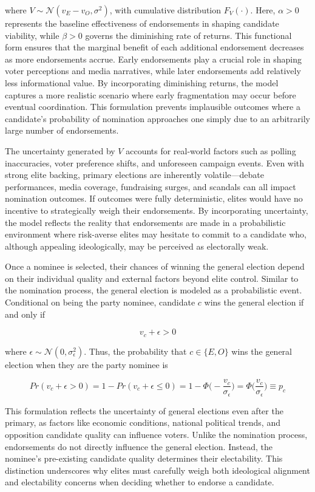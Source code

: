 where $V\sim \mathcal{N}(v_E - v_O, \sigma^2)$, with cumulative distribution $F_V(\cdot)$. Here, $\alpha >0$ represents the baseline effectiveness of endorsements in shaping candidate viability, while $\beta > 0$ governs the diminishing rate of returns. This functional form ensures that the marginal benefit of each additional endorsement decreases as more endorsements accrue. Early endorsements play a crucial role in shaping voter perceptions and media narratives, while later endorsements add relatively less informational value. By incorporating diminishing returns, the model captures a more realistic scenario where early fragmentation may occur before eventual coordination. This formulation prevents implausible outcomes where a candidate’s probability of nomination approaches one simply due to an arbitrarily large number of endorsements.

The uncertainty generated by $V$ accounts for real-world factors such as polling inaccuracies, voter preference shifts, and unforeseen campaign events. Even with strong elite backing, primary elections are inherently volatile—debate performances, media coverage, fundraising surges, and scandals can all impact nomination outcomes. If outcomes were fully deterministic, elites would have no incentive to strategically weigh their endorsements. By incorporating uncertainty, the model reflects the reality that endorsements are made in a probabilistic environment where risk-averse elites may hesitate to commit to a candidate who, although appealing ideologically, may be perceived as electorally weak.

Once a nominee is selected, their chances of winning the general election depend on their individual quality and external factors beyond elite control. Similar to the nomination process, the general election is modeled as a probabilistic event. Conditional on being the party nominee, candidate $c$ wins the general election if and only if

\[v_c + \epsilon > 0\]

where $\epsilon \sim \mathcal{N}(0, \sigma_{\epsilon}^2)$. Thus, the probability that $c \in \{E, O\}$ wins the general election when they are the party nominee is

\[Pr(v_c + \epsilon > 0) = 1-Pr(v_c + \epsilon \leq 0) = 1 -\Phi\bigg(-\frac{v_c}{\sigma_{\epsilon}}\bigg) = \Phi\bigg(\frac{v_c}{\sigma_{\epsilon}}\bigg) \equiv p_c\]

This formulation reflects the uncertainty of general elections even after the primary, as factors like economic conditions, national political trends, and opposition candidate quality can influence voters. Unlike the nomination process, endorsements do not directly influence the general election. Instead, the nominee’s pre-existing candidate quality determines their electability. This distinction underscores why elites must carefully weigh both ideological alignment and electability concerns when deciding whether to endorse a candidate.

